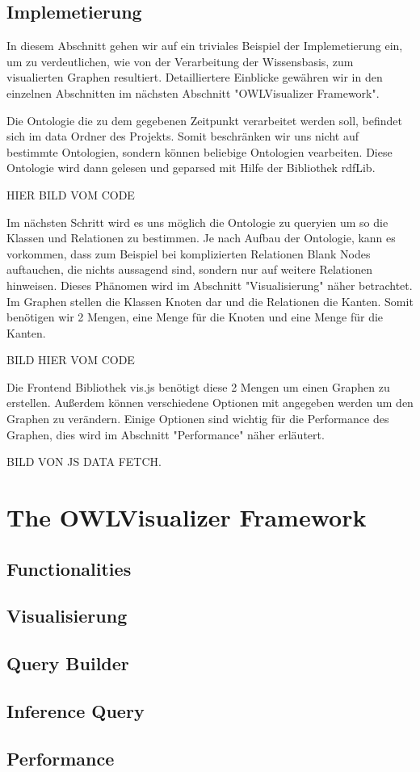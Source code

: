 \subsection*{Implemetierung}
In diesem Abschnitt gehen wir auf ein triviales Beispiel der Implemetierung ein, um zu verdeutlichen, wie von der Verarbeitung der Wissensbasis, zum visualierten Graphen resultiert.
Detailliertere Einblicke gewähren wir in den einzelnen Abschnitten im nächsten Abschnitt "OWLVisualizer Framework".

Die Ontologie die zu dem gegebenen Zeitpunkt verarbeitet werden soll, befindet sich im data Ordner des Projekts. Somit beschränken wir uns nicht auf bestimmte Ontologien, sondern können beliebige Ontologien vearbeiten.
Diese Ontologie wird dann gelesen und geparsed mit Hilfe der Bibliothek rdfLib.

HIER BILD VOM CODE

Im nächsten Schritt wird es uns möglich die Ontologie zu queryien um so die Klassen und Relationen zu bestimmen. Je nach Aufbau der Ontologie, kann es vorkommen, dass zum Beispiel bei komplizierten Relationen Blank Nodes auftauchen, die nichts aussagend sind, sondern nur auf weitere Relationen hinweisen. Dieses Phänomen wird im Abschnitt "Visualisierung" näher betrachtet.
Im Graphen stellen die Klassen Knoten dar und die Relationen die Kanten. Somit benötigen wir 2 Mengen, eine Menge für die Knoten und eine Menge für die Kanten.

BILD HIER VOM CODE

Die Frontend Bibliothek vis.js benötigt diese 2 Mengen um einen Graphen zu erstellen. Außerdem können verschiedene Optionen mit angegeben werden um den Graphen zu verändern. Einige Optionen sind wichtig für die Performance des Graphen, dies wird im Abschnitt "Performance" näher erläutert.

BILD VON JS DATA FETCH.
\section*{The OWLVisualizer Framework}

\subsection*{Functionalities}

\subsection*{Visualisierung}

\subsection*{Query Builder}

\subsection*{Inference Query}

\subsection*{Performance}